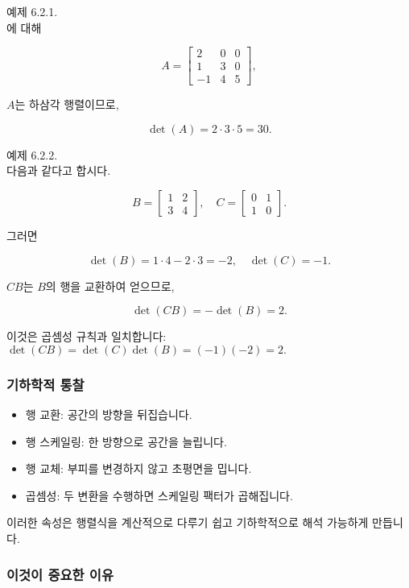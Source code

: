 \documentclass[
  12pt,
  a4paper,
]{article}
\begin{document}
예제 6.2.1.\\
에 대해

\[A = \begin{bmatrix}
2 & 0 & 0 \\
1 & 3 & 0 \\
-1 & 4 & 5
\end{bmatrix},\]

\(A\)는 하삼각 행렬이므로,

\[\det(A) = 2 \cdot 3 \cdot 5 = 30.\]

예제 6.2.2.\\
다음과 같다고 합시다.

\[B = \begin{bmatrix} 1 & 2 \\ 3 & 4 \end{bmatrix}, \quad
C = \begin{bmatrix} 0 & 1 \\ 1 & 0 \end{bmatrix}.\]

그러면

\[\det(B) = 1\cdot 4 - 2\cdot 3 = -2, \quad \det(C) = -1.\]

\(CB\)는 \(B\)의 행을 교환하여 얻으므로,

\[\det(CB) = -\det(B) = 2.\]

이것은 곱셈성 규칙과 일치합니다: \(\det(CB) = \det(C)\det(B) = (-1)(-2) = 2.\)

\subsubsection{기하학적 통찰}\label{geometric-insights}

\begin{itemize}
\item
  행 교환: 공간의 방향을 뒤집습니다.
\item
  행 스케일링: 한 방향으로 공간을 늘립니다.
\item
  행 교체: 부피를 변경하지 않고 초평면을 밉니다.
\item
  곱셈성: 두 변환을 수행하면 스케일링 팩터가 곱해집니다.
\end{itemize}

이러한 속성은 행렬식을 계산적으로 다루기 쉽고 기하학적으로 해석 가능하게 만듭니다.

\subsubsection{이것이 중요한 이유}\label{why-this-matters-21}
\end{document}
